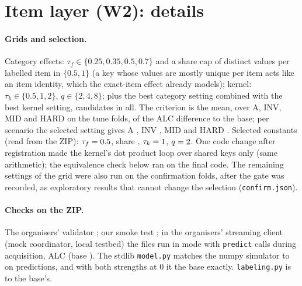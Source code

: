 \documentclass{article}
\begin{document}
\section{Item layer (W2): details}
\label{app:wtwo}

\paragraph{Grids and selection.} Category effects: $\tau_f\in\{0.25,0.35,0.5,0.7\}$ and a share cap of distinct values per labelled item in $\{0.5,1\}$ (a key whose values are mostly unique per item acts like an item identity, which the exact-item effect already models); kernel: $\tau_k\in\{0.5,1,2\}$, $q\in\{2,4,8\}$; plus the best category setting combined with the best kernel setting, \WtNSettings{} candidates in all. The criterion is the mean, over A, INV, MID and HARD on the tune folds, of the ALC difference to the base; per scenario the selected setting gives A \WtTuneA, INV \WtTuneInv, MID \WtTuneMid{} and HARD \WtTuneHard. Selected constants (read from the ZIP): $\tau_f=0.5$, share \WtFeatShare, $\tau_k=1$, $q=2$. One code change after registration made the kernel's dot product loop over shared keys only (same arithmetic); the equivalence check below ran on the final code. The remaining settings of the grid were also run on the confirmation folds, after the gate was recorded, as exploratory results that cannot change the selection (\texttt{confirm.json}).

\paragraph{Checks on the ZIP.} The organisers' validator \WkValidator; our smoke test \WkSmoke; in the organisers' streaming client (mock coordinator, local testbed) the files run in \WkLoopMode{} mode with \WkLoopAcqPredCalls{} \texttt{predict} calls during acquisition, ALC \WkLoopAlc{} (base \CkSelLoopAlc). The stdlib \texttt{model.py} matches the numpy simulator to \WkEquivMaxDiff{} on \WkEquivN{} predictions, and with both strengths at 0 it \WkZeroEqualsBase{} the base exactly. \texttt{labeling.py} is \SubLabelingSame{} to the base's.
\end{document}
